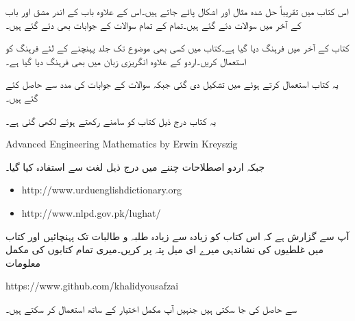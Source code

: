 اس کتاب میں تقریباً  حل شدہ مثال اور  اشکال پائے جاتے ہیں۔اس کے علاوہ باب کے اندر  مشق اور باب کے آخر میں  سوالات دئے گئے ہیں۔تمام کے تمام سوالات کے جوابات بھی دئے گئے ہیں۔

کتاب کے آخر میں فرہنگ دیا گیا ہے۔کتاب میں کسی بھی موضوع تک جلد پہنچنے کے لئے فرہنگ کو استعمال کریں۔اردو کے علاوہ انگریزی زبان میں بھی فرہنگ دیا گیا ہے۔

یہ کتاب  استعمال کرتے ہوئے  میں تشکیل دی گئی جبکہ سوالات کے جوابات  کی مدد سے حاصل کئے گئے ہیں۔

یہ کتاب درج ذیل کتاب کو سامنے رکھتے ہوئے لکھی گئی ہے۔

{
\begin{otherlanguage}{english}
Advanced Engineering Mathematics by Erwin Kreyszig
\end{otherlanguage}
}

جبکہ اردو اصطلاحات چننے میں درج ذیل لغت سے استفادہ  کیا گیا۔
{
\begin{otherlanguage}{english}
\begin{itemize}
\item
http:/\!\!/www.urduenglishdictionary.org
\item
http:/\!\!/www.nlpd.gov.pk/lughat/
\end{itemize}
\end{otherlanguage}
}
آپ سے گزارش ہے کہ اس کتاب کو زیادہ سے زیادہ طلبہ و طالبات تک پہنچائیں اور کتاب میں غلطیوں کی نشاندہی میرے  ای میل پتہ پر کریں۔میری تمام کتابوں کی مکمل  معلومات

{
\begin{otherlanguage}{english}
https:/\!\!/www.github.com/khalidyousafzai
\end{otherlanguage}
}

سے حاصل کی جا سکتی ہیں جنہیں آپ مکمل اختیار کے ساتھ استعمال کر سکتے ہیں۔
\vspace{5mm}

{}


